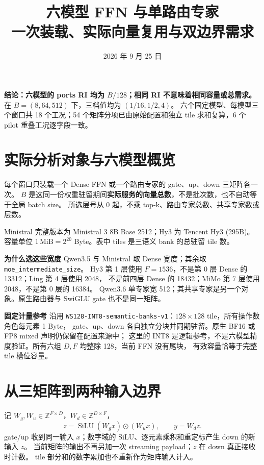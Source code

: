\documentclass[11pt,a4paper,fontset=fandol]{ctexart}
\title{\bfseries 六模型 FFN 与单路由专家\\[5pt]\large 一次装载、实际向量复用与双边界需求}
\author{}\date{2026 年 9 月 25 日}
\newcommand{\para}[1]{\par\smallskip\noindent\textbf{#1}\quad}
\begin{document}
\maketitle\vspace{-1.5em}
\noindent\textbf{结论：六模型的 ports RI 均为 $B/128$；相同 RI 不意味着相同容量或总需求。}
在 $B=(8,64,512)$ 下，三档值均为 $(1/16,1/2,4)$。
六个固定模型、每模型三个窗口共 18 个工况；54 个矩阵分项已由原始配置和独立 tile 求和复算，6 个 pilot 重叠工况逐字段一致。

\section{实际分析对象与六模型概览}
每个窗口只装载一个 Dense FFN 或一个路由专家的 gate、up、down 三矩阵各一次。
$B$ 是这同一份权重驻留期间\textbf{实际服务的向量总数}，不是批次数，也不自动等于全局 batch size。
所选层号从 0 起，不乘 top-k、路由专家总数、共享专家数或层数。

\begin{center}\small

\end{center}
\noindent\small Ministral 完整版本为 Ministral 3 8B Base 2512；Hy3 为 Tencent Hy3 (295B)。
容量单位 $1\,\mathrm{MiB}=2^{20}$ Byte。表中 tiles 是三语义 bank 的总驻留 tile 数。\normalsize

\para{为什么选这些宽度}
Qwen3.5 与 Ministral 取 Dense 宽度；其余取\texttt{moe\_intermediate\_size}。
Hy3 第 1 层使用 $F=1536$，不是第 0 层 Dense 的 13312；Ling 第 4 层使用 2048，
不是前四层 Dense 的 18432；MiMo 第 7 层使用 2048，不是第 0 层的 16384。
Qwen3.6 单专家宽 512；其共享专家是另一个对象。原生路由器与 SwiGLU gate 也不是同一矩阵。

\begin{center}\small

\end{center}

\para{固定计量参考}
沿用 \texttt{WS128-INT8-semantic-banks-v1}：$128\times128$ tile，所有操作数角色每元素 1 Byte，
gate、up、down 各自独立分块并同期驻留。原生 BF16 或 FP8 mixed 声明仍保留在配置来源中；
这里的 INT8 是逻辑参考，不是六模型精度验证。所有六组 $D,F$ 均整除 128，当前 FFN 没有尾块，
有效容量恰等于完整 tile 槽位容量。

\clearpage
\section{从三矩阵到两种输入边界}
记 $W_g,W_u\in\mathbb Z^{F\times D}$，$W_d\in\mathbb Z^{D\times F}$，
\begin{equation}
z=\operatorname{SiLU}(W_gx)\odot(W_ux),\qquad y=W_dz.
\end{equation}
gate/up 收到同一输入 $x$；数字域的 SiLU、逐元素乘积和重定标产生 down 的新输入 $z$。
当前矩阵的输出不再另加一次 streaming payload；$z$ 在 down 真正接收时计数。
tile 部分和的数字累加也不重新作为矩阵输入计入。
\end{document}
